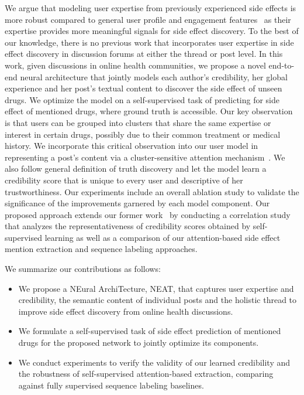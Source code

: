 \documentclass{bmcart}
\begin{document}
We argue that modeling user expertise from previously experienced side effects is more robust compared to general user profile and engagement features~\cite{mukherjee2014people,vydiswaran2019identifying} as their expertise provides more meaningful signals for side effect discovery.
To the best of our knowledge, there is no previous work that incorporates user expertise in side effect discovery in discussion forums at either the thread or post level.
In this work, given discussions in online health communities, we propose a novel end-to-end neural architecture that jointly models each author's credibility, her global experience and her post's textual content to discover the side effect of unseen drugs.
We optimize the model on a self-supervised task of predicting for side effect of mentioned drugs, where ground truth is accessible.
Our key observation is that users can be grouped into clusters 
that share the same expertise or interest in certain drugs, 
possibly due to their common treatment or medical history. 
We incorporate this critical observation into our user model in representing a post's content via a cluster-sensitive attention mechanism~\cite{halder2018cold}.
We also follow general definition of truth discovery and let the
model learn a credibility score that is unique to every user and
descriptive of her trustworthiness.
Our experiments include an overall ablation study to validate the significance of the improvements garnered by each model component. Our proposed approach extends 
our former work~\cite{nguyen-etal-2018-treatment}  
by conducting a correlation study that analyzes the representativeness of 
credibility scores obtained by self-supervised learning  
as well as a comparison of our attention-based side effect mention extraction and sequence labeling approaches.

We summarize our contributions as follows: 
\begin{itemize}
\item We propose a NEural ArchiTecture, NEAT, that captures user expertise and credibility, the semantic content of individual posts and the holistic thread to improve side effect discovery from online health discussions.
\item We formulate a self-supervised task of side effect prediction of mentioned drugs for the proposed network to jointly optimize its components.
\item We conduct experiments to verify the validity of our learned credibility and the robustness of self-supervised attention-based extraction, comparing against fully supervised sequence labeling baselines.
\end{itemize}
\end{document}
